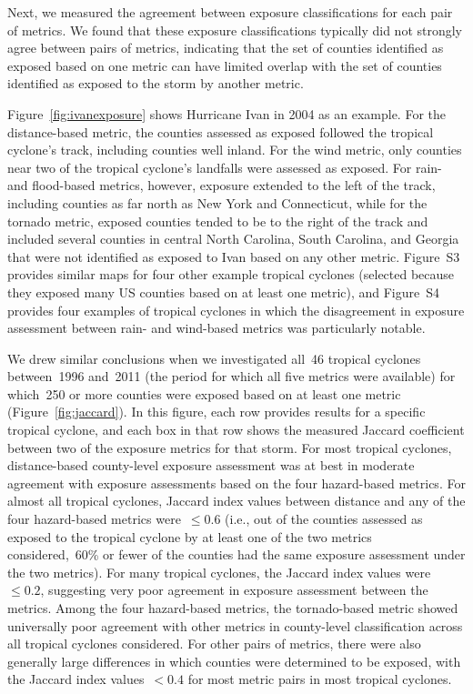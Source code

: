 Next, we measured the agreement between exposure classifications for each pair
of metrics. We found that these exposure classifications typically did not
strongly agree between pairs of metrics, indicating that the set of counties
identified as exposed based on one metric can have limited overlap with the
set of counties identified as exposed to the storm by another metric. 

Figure~\ref{fig:ivanexposure} shows Hurricane Ivan in 2004 as an example. For
the distance-based metric, the counties assessed as exposed followed the
tropical cyclone's track, including counties well inland. For the wind metric,
only counties near two of the tropical cyclone's landfalls were assessed as
exposed. For rain- and flood-based metrics, however, exposure extended to the
left of the track, including counties as far north as New York and Connecticut,
while for the tornado metric, exposed counties tended to be to the right of the
track and included several counties in central North Carolina, South Carolina,
and Georgia that were not identified as exposed to Ivan based on any other
metric. Figure~S3 provides similar maps for four other example tropical
cyclones (selected because they exposed many \ac{US}  counties based on at
least one metric), and Figure~S4 provides four examples of tropical cyclones in
which the disagreement in exposure assessment between rain- and wind-based
metrics was particularly notable.

We drew similar conclusions when we investigated all~46 tropical cyclones
between~1996 and~2011 (the period for which all five metrics were available)
for which~250 or more counties were exposed based on at least one metric
(Figure~\ref{fig:jaccard}). In this figure, each row provides results for a
specific tropical cyclone, and each box in that row shows the measured Jaccard
coefficient between two of the exposure metrics for that storm.  For most
tropical cyclones, distance-based county-level exposure assessment was at best
in moderate agreement with exposure assessments based on the four hazard-based
metrics. For almost all tropical cyclones, Jaccard index values between
distance and any of the four hazard-based metrics were~$\le0.6$ (i.e., out of
the counties assessed as exposed to the tropical cyclone by at least one of the
two metrics considered,~60\si{\percent} or fewer of the counties had the same
exposure assessment under the two metrics). For many tropical cyclones, the
Jaccard index values were~$\le0.2$, suggesting very poor agreement in exposure
assessment between the metrics.  Among the four hazard-based metrics, the
tornado-based metric showed universally poor agreement with other metrics in
county-level classification across all tropical cyclones considered.  For other
pairs of metrics, there were also generally large differences in which counties
were determined to be exposed, with the Jaccard index values~$<0.4$ for most
metric pairs in most tropical cyclones.

